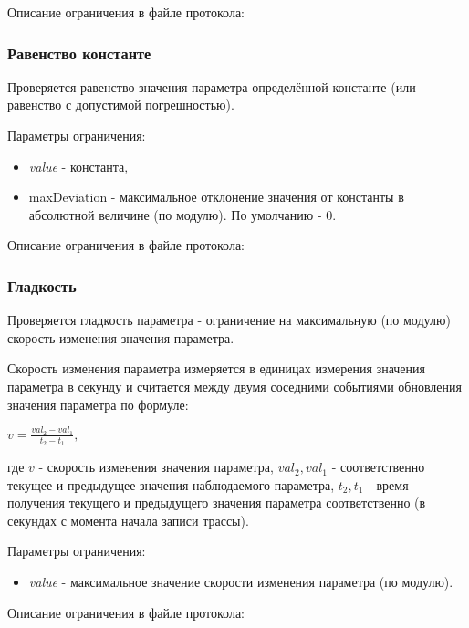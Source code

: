 Описание ограничения в файле протокола:




\subsubsection{Равенство константе}

Проверяется равенство значения параметра определённой константе (или равенство 
с допустимой погрешностью).

Параметры ограничения:
\begin{itemize}
 \item \textit{value} - константа,
 \item maxDeviation - максимальное отклонение значения от константы в 
абсолютной величине (по модулю). По умолчанию - 0.
\end{itemize}

Описание ограничения в файле протокола:




\subsubsection{Гладкость}

Проверяется гладкость параметра - ограничение на максимальную (по модулю) 
скорость изменения значения параметра.

Скорость изменения параметра измеряется в единицах измерения значения параметра 
в секунду и считается между двумя соседними событиями обновления значения 
параметра по формуле:

$
v = \frac{val_2 - val_1}{t_2 - t_1},
$

где $v$ - скорость изменения значения параметра, $val_2, val_1$ - 
соответственно текущее и предыдущее значения наблюдаемого параметра, $t_2, t_1$ 
- время получения текущего и предыдущего значения параметра соответственно (в 
секундах с момента начала записи трассы).

Параметры ограничения:
\begin{itemize}
 \item \textit{value} - максимальное значение скорости изменения параметра (по 
модулю).
\end{itemize}

Описание ограничения в файле протокола:

